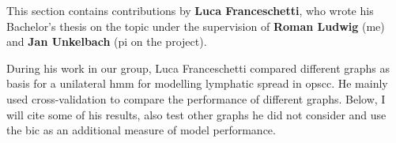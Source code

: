 \begin{tcolorbox}[title=\faIcon{users} Contributions, parbox=false]
    This section contains contributions by  \textbf{Luca Franceschetti}, who wrote his Bachelor's thesis \cite{franceschetti_comparison_2022} on the topic under the supervision of  \textbf{Roman Ludwig} (me) and  \textbf{Jan Unkelbach} (\gls{pi} on the project).

    During his work in our group, Luca Franceschetti compared different graphs as basis for a unilateral \gls{hmm} for modelling lymphatic spread in \gls{opscc}. He mainly used cross-validation to compare the performance of different graphs. Below, I will cite some of his results, also test other graphs he did not consider and use the \gls{bic} as an additional measure of model performance.
\end{tcolorbox}

